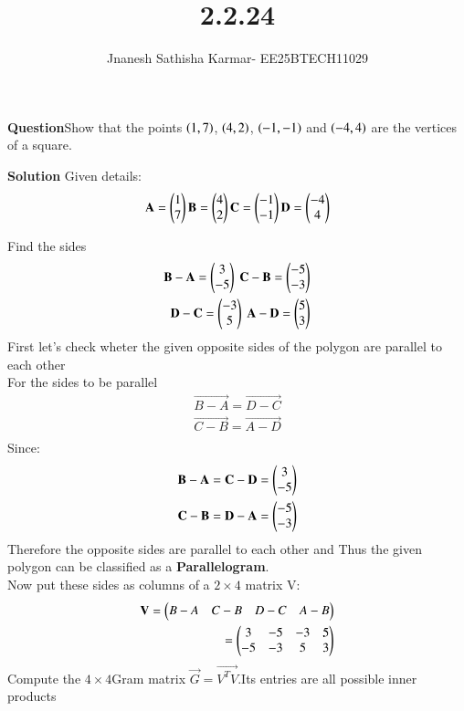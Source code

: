 \documentclass[journal]{IEEEtran}
\theoremstyle{remark}
\begin{document}
\setlength{\abovedisplayskip}{0pt}
\setlength{\belowdisplayskip}{0pt}
\setlength{\abovedisplayshortskip}{0pt}
\setlength{\belowdisplayshortskip}{0pt}

\onecolumn

\title{2.2.24}
\author{Jnanesh Sathisha Karmar- EE25BTECH11029}
\maketitle


\renewcommand{\thefigure}{\theenumi}
\renewcommand{\thetable}{\theenumi}
\textbf{Question}Show that the points $\left(1, 7\right)$, $\left(4, 2\right)$, $\left(-1, -1\right)$ and $\left(-4, 4\right)$ are the vertices of a square.

\textbf{Solution}
Given details:
\begin{align}
    \mathbf{A}=\begin{pmatrix}1\\7\end{pmatrix}  \mathbf{B}=\begin{pmatrix}4\\2\end{pmatrix} \mathbf{C}=\begin{pmatrix}-1\\-1\end{pmatrix} \mathbf{D}=\begin{pmatrix}-4\\4\end{pmatrix}
\end{align}

Find the sides
\begin{align}
\vec{B}-\vec{A}=\myvec{3\\-5} \  \vec{C}-\vec{B}=\myvec{-5\\-3} \\
\vec{D}-\vec{C}=\myvec{-3\\5} \ 
\vec{A}-\vec{D}=\myvec{5\\3}
\end{align}
First let's check wheter the given opposite sides of the polygon are parallel to each other \\
For the sides to be parallel 
\begin{align}
    \vec{B-A}=\vec{D-C}\\
    \vec{C-B}=\vec{A-D}\\
\end{align}
Since:
\begin{align}
    \mathbf{B-A}=\mathbf{C-D}=\begin{pmatrix}3\\-5\end{pmatrix}\\
    \mathbf{C-B}=\mathbf{D-A}=\begin{pmatrix}-5\\-3\end{pmatrix}
\end{align}
Therefore the opposite sides are parallel to each other and Thus the given polygon can be classified as a \textbf{Parallelogram}.\\
Now put these sides as columns of a $2\times4$ matrix V:
\begin{align}
    \mathbf{V}=\begin{pmatrix}B-A&C-B&D-C&A-B\end{pmatrix}\\
    =\begin{pmatrix}3 & -5 & -3 & 5\\-5 & -3 & 5 & 3\end{pmatrix}
\end{align}
Compute the $4\times4$Gram matrix $\vec{G}=\vec{V^TV}$.Its entries are all possible inner products\\
\end{document}
